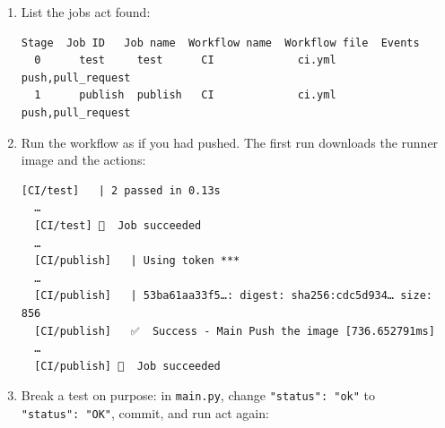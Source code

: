 \begin{enumerate}
\begin{codeblock}
  \end{codeblock}

  If git asks who you are, set \texttt{user.name} and \texttt{user.email} with \texttt{git\ config} inside the folder, then commit again.
\item
  List the jobs act found:

  \begin{codeblock}

\begin{Shaded}
\begin{Highlighting}[]
 
\end{Highlighting}
\end{Shaded}

  \end{codeblock}

  \begin{codeblock}
  \begin{Verbatim}[formatcom=\outputstyle]
  Stage  Job ID   Job name  Workflow name  Workflow file  Events
  0      test     test      CI             ci.yml         push,pull_request
  1      publish  publish   CI             ci.yml         push,pull_request
  \end{Verbatim}
  \end{codeblock}
\item
  Run the workflow as if you had pushed. The first run downloads the runner image and the actions:

  \begin{codeblock}

\begin{Shaded}
\begin{Highlighting}[]
\end{Highlighting}
\end{Shaded}

  \end{codeblock}

  \begin{codeblock}
  \begin{Verbatim}[formatcom=\outputstyle]
  [CI/test]   | 2 passed in 0.13s
  …
  [CI/test] 🏁  Job succeeded
  …
  [CI/publish]   | Using token ***
  …
  [CI/publish]   | 53ba61aa33f5…: digest: sha256:cdc5d934… size: 856
  [CI/publish]   ✅  Success - Main Push the image [736.652791ms]
  …
  [CI/publish] 🏁  Job succeeded
  \end{Verbatim}
  \end{codeblock}
\item
  Break a test on purpose: in \texttt{main.py}, change \texttt{"status":\ "ok"} to \texttt{"status":\ "OK"}, commit, and run act again:


\end{enumerate}
